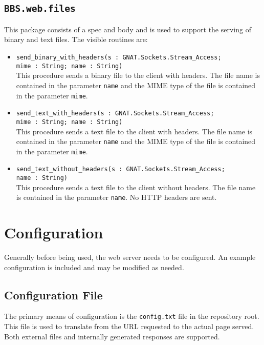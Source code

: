 \documentclass[10pt, openany]{book}
\newcommand{\package}[1]{\texttt{#1}}
\newcommand{\function}[1]{\texttt{#1}}
\newcommand{\keyword}[1]{\texttt{#1}}
\begin{document}
\subsection{\package{BBS.web.files}}
This package consists of a spec and body and is used to support the serving of binary and text files.  The visible routines are:
\begin{itemize}
  \item \function{send\_binary\_with\_headers(s : GNAT.Sockets.Stream\_Access;\\
                         mime : String; name : String)}\\
  This procedure sends a binary file to the client with headers.  The file name is contained in the parameter \keyword{name} and the MIME type of the file is contained in the parameter \keyword{mime}.

  \item \function{send\_text\_with\_headers(s : GNAT.Sockets.Stream\_Access;\\
                       mime : String; name : String)}\\
  This procedure sends a text file to the client with headers.  The file name is contained in the parameter \keyword{name} and the MIME type of the file is contained in the parameter \keyword{mime}.

  \item \function{send\_text\_without\_headers(s : GNAT.Sockets.Stream\_Access;\\
                          name : String)}\\
  This procedure sends a text file to the client without headers.  The file name is contained in the parameter \keyword{name}.  No HTTP headers are sent.
\end{itemize}

\section{Configuration}
Generally before being used, the web server needs to be configured.  An example configuration is included and may be modified as needed.

\subsection{Configuration File}
The primary means of configuration is the \texttt{config.txt} file in the repository root.  This file is used to translate from the URL requested to the actual page served.  Both external files and internally generated responses are supported.
\end{document}
